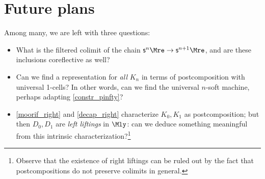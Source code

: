 \section{Future plans}
Among many, we are left with three questions:
\begin{itemize}
	\item What is the filtered colimit of the chain $\aMre[n]\to \aMre[n+1]$, and are these inclusions coreflective as well?
	\item Can we find a representation for \emph{all} $K_n$ in terms of postcomposition with universal 1-cells? In other words, can we find the universal $n$-soft machine, perhaps adapting \autoref{constr_pinfty}?
	\item \autoref{moorif_right} and \autoref{decap_right} characterize $K_0,K_1$ as postcomposition; but then $D_0,D_1$ are \emph{left liftings} in $\Mly$: can we deduce something meaningful from this intrinsic characterization?\footnote{Observe that the existence of right liftings \cite[2.1.3]{coend-calcu} can be ruled out by the fact that postcompositions do not preserve colimits in general.}
\end{itemize}